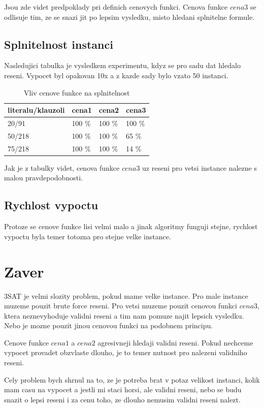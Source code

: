 \documentclass[12pt,a4paper]{article}
\begin{document}
Jsou zde videt predpoklady pri definich cenovych funkci. Cenova funkce $cena3$ se odlisuje tim, ze se snazi jit po lepsim vysledku, misto hledani splnitelne formule.

\subsection{Splnitelnost instanci}

Nasledujici tabulka je vysledkem experimentu, kdyz se pro sadu dat hledalo reseni. Vypocet byl opakovan 10x a z kazde sady bylo vzato 50 instanci. 

\begin{table}[H]
\centering
\caption{Vliv cenove funkce na splnitelnost}
\label{wat}
\begin{tabular}{|l|l|l|l|} \hline
literalu/klauzoli & cena1  & cena2  & cena3   \\ \hline
20/91             & 100 \% & 100 \% & 100 \%  \\ \hline
50/218            & 100 \% & 100 \% & 65  \%  \\ \hline
75/218            & 100 \% & 100 \% & 14  \%  \\ \hline
\end{tabular}
\end{table}

Jak je z tabulky videt, cenova funkce $cena3$ uz reseni pro vetsi instance nalezne s malou pravdepodobnosti.

\subsection{Rychlost vypoctu}

Protoze se cenove funkce lisi velmi malo a jinak algoritmy funguji stejne, rychlost vypoctu byla temer totozna pro stejne velke instance.

\section{Zaver}

3SAT je velmi slozity problem, pokud mame velke instance. Pro male instance muzeme pouzit brute force reseni. Pro vetsi muzeme pouzit cenovou funkci $cena3$, ktera neznevyhoduje validni reseni a tim nam pomuze najit lepsich vysledku. Nebo je mozne  pouzit jinou cenovou funkci na podobnem principu.

Cenove funkce $cena1$ a $cena2$ agresivneji hledaji validni reseni. Pokud nechceme vypocet provadet obzvlaste dlouho, je to temer nutnost pro nalezeni validniho reseni.

Cely problem bych shrnul na to, ze je potreba brat v potaz velikost instanci, kolik mam casu na vypocet a jestli mi staci horsi, ale validni reseni, nebo se budu snazit o lepsi reseni i za cenu toho, ze dlouho nemusim validni reseni nalezt.

\end{document}
